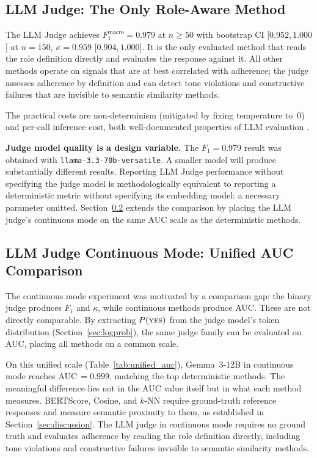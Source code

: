 \documentclass[11pt,a4paper]{article}
\begin{document}
\subsection{LLM Judge: The Only Role-Aware Method}

The LLM Judge achieves $F_1^{\text{macro}} = 0.979$ at $n \geq 50$ with
bootstrap CI [$0.952$,\,$1.000$] at $n = 150$, $\kappa = 0.959$
[$0.904$,\,$1.000$]. It is the only evaluated method that reads the role
definition directly and evaluates the response against it. All other methods
operate on signals that are at best correlated with adherence; the judge
assesses adherence by definition and can detect tone violations and
constructive failures that are invisible to semantic similarity methods.

The practical costs are non-determinism (mitigated by fixing temperature to~0)
and per-call inference cost, both well-documented properties of LLM evaluation
\citep{zheng2023judging}.

\textbf{Judge model quality is a design variable.} The $F_1 = 0.979$ result
was obtained with \texttt{llama-3.3-70b-versatile}. A smaller model will
produce substantially different results. Reporting LLM Judge performance
without specifying the judge model is methodologically equivalent to reporting
a deterministic metric without specifying its embedding model: a necessary
parameter omitted. Section~\ref{sec:logprob_discussion} extends the comparison by
placing the LLM judge's continuous mode on the same AUC scale as the deterministic methods.

\subsection{LLM Judge Continuous Mode: Unified AUC Comparison}
\label{sec:logprob_discussion}

The continuous mode experiment was motivated by a comparison gap: the binary
judge produces $F_1$ and $\kappa$, while continuous methods produce AUC\@.
These are not directly comparable. By extracting $P(\textsc{yes})$ from the
judge model's token distribution (Section~\ref{sec:logprob}), the same
judge family can be evaluated on AUC, placing all methods on a common scale.

On this unified scale (Table~\ref{tab:unified_auc}), Gemma~3-12B in
continuous mode reaches AUC\,$= 0.999$, matching the top deterministic
methods.
The meaningful difference lies not in the AUC value itself but in what each
method measures. BERTScore, Cosine, and $k$-NN require ground-truth
reference responses and measure semantic proximity to them, as established
in Section~\ref{sec:discussion}. The LLM judge in continuous mode requires
no ground truth and evaluates adherence by reading the role definition
directly, including
tone violations and constructive failures invisible to semantic similarity
methods.
\end{document}
